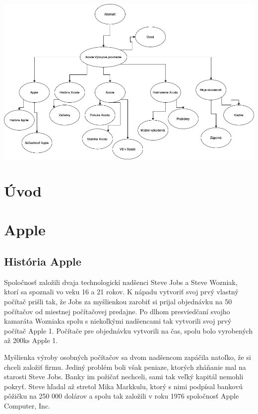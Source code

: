 \documentclass{article}
\begin{document}
\vspace{0.5cm}
\begin{center}
    \includegraphics[width=1.1\textwidth]{diagram_kapitol.png}
\end{center}

\newpage
\renewcommand*\contentsname{Obsah}
\tableofcontents

\newpage
\section{Úvod}

\newpage
\section{Apple}
\subsection{História Apple}
Spoločnosť založili dvaja technologickí nadšenci Steve Jobs a Steve Wozniak,  ktorí sa spoznali vo veku 16 a 21 rokov.  K nápadu vytvoriť svoj prvý vlastný počítač prišli tak,  že Jobs za myšlienkou zarobiť si prijal objednávku na 50 počítačov od miestnej počítačovej predajne.  Po dlhom presviedčaní svojho kamaráta Wozniaka spolu s niekoľkými nadšencami tak vytvorili svoj prvý počítač Apple 1.  Počítače pre objednávku vytvorili na čas,  spolu bolo vyrobených až 200ks Apple 1.  \par
Myšlienka výroby osobných počítačov sa dvom nadšencom zapáčila natoľko,  že si chceli založiť firmu.  Jediný problém boli však peniaze,  ktorých zháňanie mal na starosti Steve Jobs.  Banky im požičať nechceli,  sami tak veľký kapitál nemohli pokryť.  Steve hľadal až stretol Mika Markkulu,  ktorý s nimi podpísal bankovú pôžičku na 250 000 dolárov a spolu tak založili v roku 1976 spoločnosť Apple Computer, Inc.
\end{document}

